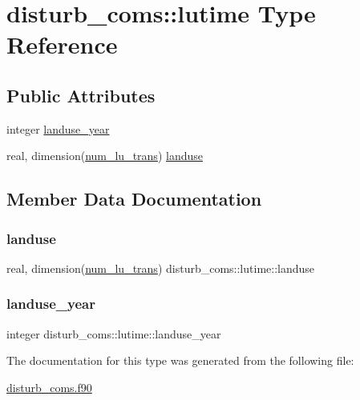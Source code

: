 \hypertarget{structdisturb__coms_1_1lutime}{}\section{disturb\+\_\+coms\+:\+:lutime Type Reference}
\label{structdisturb__coms_1_1lutime}
\subsection*{Public Attributes}
\begin{DoxyCompactItemize}
\item 
integer \hyperlink{structdisturb__coms_1_1lutime_afba2fbf3ca04baa3beedb424ebb51022}{landuse\+\_\+year}
\item 
real, dimension(\hyperlink{namespacedisturb__coms_ac39535da2e75c569a86d8f91379d75d9}{num\+\_\+lu\+\_\+trans}) \hyperlink{structdisturb__coms_1_1lutime_a807d824fe2cb6854099a8f49246617c7}{landuse}
\end{DoxyCompactItemize}


\subsection{Member Data Documentation}
\mbox{\label{structdisturb__coms_1_1lutime_a807d824fe2cb6854099a8f49246617c7}} 
\subsubsection{\texorpdfstring{landuse}{landuse}}
{\footnotesize\ttfamily real, dimension(\hyperlink{namespacedisturb__coms_ac39535da2e75c569a86d8f91379d75d9}{num\+\_\+lu\+\_\+trans}) disturb\+\_\+coms\+::lutime\+::landuse}

\mbox{\label{structdisturb__coms_1_1lutime_afba2fbf3ca04baa3beedb424ebb51022}} 
\subsubsection{\texorpdfstring{landuse\+\_\+year}{landuse\_year}}
{\footnotesize\ttfamily integer disturb\+\_\+coms\+::lutime\+::landuse\+\_\+year}



The documentation for this type was generated from the following file\+:\begin{DoxyCompactItemize}
\item 
\hyperlink{disturb__coms_8f90}{disturb\+\_\+coms.\+f90}\end{DoxyCompactItemize}

